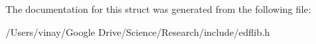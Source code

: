 The documentation for this struct was generated from the following file\+:\begin{DoxyCompactItemize}
\item 
/\+Users/vinay/\+Google Drive/\+Science/\+Research/include/edflib.\+h\end{DoxyCompactItemize}
